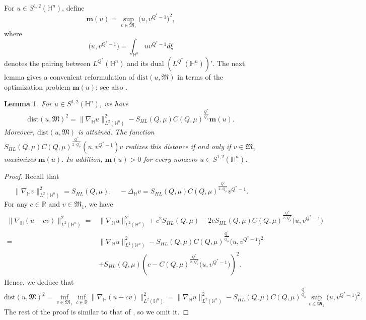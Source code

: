 \documentclass[10pt,a4paper]{amsart}
\newtheorem{lemma}{Lemma}[section]
\begin{document}
For $u\in S^{1,2}(\mathbb{H}^{n})$, define
\begin{equation*}
 \mathbf{m}(u)=\sup\limits_{v\in \mathfrak{M}_1}\Big(u,v^{Q^{\ast}-1}\Big)^2,
\end{equation*}
where
\begin{equation*}
 \Big(u,v^{Q^{\ast}-1}\Big)=\int_{\mathbb{H}^{n}} u v^{Q^{\ast}-1}d\xi
\end{equation*}
denotes the pairing between $L^{Q^{\ast}}(\mathbb{H}^{n})$ and its dual $(L^{Q^{\ast}}(\mathbb{H}^{n}))'$.
{The next lemma gives a convenient reformulation of $\mathrm{dist}(u,\mathfrak M)$ in terms of the optimization problem $\mathbf m(u)$; see also \cite[Lemma 2.2]{K25}.}
\begin{lemma}\label{l4.1}
{For $u\in S^{1,2}(\mathbb H^n)$, we have}
\begin{equation}\label{eq:l4.1}
 \mathrm{dist}(u,\mathfrak{M})^2=\|\nabla_\mathbb{H} u\|_{L^2(\mathbb{H}^n)}^2-S_{HL}(Q,\mu)C(Q,\mu)^{\frac{Q^{\ast}}{Q^{\ast}_{\mu}}}\mathbf{m}(u).
\end{equation}
{Moreover, $\mathrm{dist}(u,\mathfrak{M})$ is attained. The function
$S_{HL}(Q,\mu)C(Q,\mu)^{\frac{Q^{\ast}}{2\cdot Q^{\ast}_{\mu}}}(u,v^{Q^{\ast}-1})v
$
realizes this distance if and only if $v\in\mathfrak M_1$ maximizes $\mathbf m(u)$. In addition, $\mathbf m(u)>0$ for every nonzero $u\in S^{1,2}(\mathbb H^n)$.}
\end{lemma}
\begin{proof}
Recall that
\begin{equation*}
 \|\nabla_\mathbb{H}v\|_{{L}^{2}(\mathbb{H}^n)}^2=S_{HL}(Q,\mu),\quad -\Delta_{\mathbb{H}} v=S_{HL}(Q,\mu)C(Q,\mu)^{\frac{Q^{\ast}}{2\cdot Q^{\ast}_{\mu}}}v^{Q^{\ast}-1}.
\end{equation*}
For any $c\in \mathbb{R}$ and $v\in \mathfrak{M}_1$, we have
\begin{align*}
 \|\nabla_\mathbb{H} (u-cv)\|_{L^2(\mathbb{H}^n)}^2=&\|\nabla_\mathbb{H} u\|_{L^2(\mathbb{H}^n)}^2+
 c^2S_{HL}(Q,\mu)-2cS_{HL}(Q,\mu)C(Q,\mu)^{\frac{Q^{\ast}}{2\cdot Q^{\ast}_{\mu}}}\Big(u,v^{Q^{\ast}-1}\Big)\\
 =&\|\nabla_\mathbb{H} u\|_{L^2(\mathbb{H}^n)}^2-S_{HL}(Q,\mu)C(Q,\mu)^{\frac{Q^{\ast}}{ Q^{\ast}_{\mu}}}\Big(u,v^{Q^{\ast}-1}\Big)^2\\
 &+S_{HL}(Q,\mu)\left(c-C(Q,\mu)^{\frac{Q^{\ast}}{2\cdot Q^{\ast}_{\mu}}}\Big(u,v^{Q^{\ast}-1}\Big)\right)^2.
\end{align*}
Hence, we deduce that
\begin{equation*}
 \mathrm{dist}(u,\mathfrak{M})^2=\inf\limits_{v\in \mathfrak{M}_1}\inf\limits_{c\in \mathbb{R}}
 \|\nabla_\mathbb{H} (u-cv)\|_{L^2(\mathbb{H}^n)}^2=
 \|\nabla_\mathbb{H} u\|_{L^2(\mathbb{H}^n)}^2-S_{HL}(Q,\mu)C(Q,\mu)^{\frac{Q^{\ast}}{Q^{\ast}_{\mu}}}\sup\limits_{v\in \mathfrak{M}_1}\Big(u,v^{Q^{\ast}-1}\Big)^2.
\end{equation*}
The rest of the proof is similar to that of \cite[Lemma 2.2]{K25}, so we omit it.
\end{proof}
\end{document}
